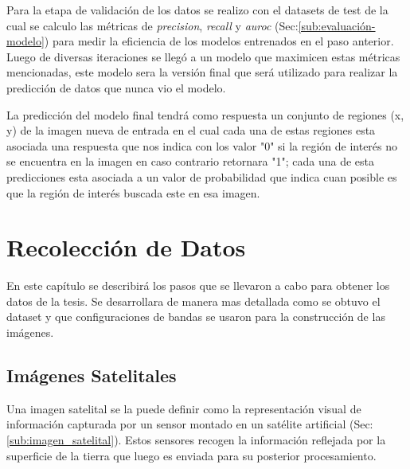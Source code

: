 


Para la etapa de validación de los datos se realizo con el datasets de test de la cual se calculo las métricas de \textit{precision}, \textit{recall} y \textit{auroc} (Sec:\ref{sub:evaluación-modelo}) para medir la eficiencia de los  modelos entrenados en el paso anterior. Luego de diversas iteraciones se llegó a un modelo que maximicen estas métricas mencionadas, este modelo sera la versión final que será utilizado para realizar la predicción de datos que nunca vio el modelo.

La predicción del modelo final tendrá como respuesta un conjunto de regiones (x, y) de la imagen nueva de entrada en el cual cada una de estas regiones esta asociada una respuesta que nos indica con los valor "0" si la región de interés no se encuentra en la imagen en caso contrario  retornara "1"; cada una de esta predicciones esta asociada a un valor de probabilidad que indica cuan posible es que la región de interés buscada este en esa imagen.

\section{Recolección de Datos}\label{sec:recoleccion}

En este capítulo se describirá  los pasos que se llevaron a cabo para obtener los datos de la tesis. Se  desarrollara de manera mas detallada como se obtuvo el dataset y que configuraciones de bandas se usaron para la construcción de las imágenes.


\subsection{Imágenes Satelitales}

Una imagen satelital se la puede definir como la representación visual de información capturada por un sensor montado en un satélite artificial (Sec:\ref{sub:imagen_satelital}). Estos sensores recogen la información reflejada por la superficie de la tierra que luego es enviada para su posterior procesamiento.


